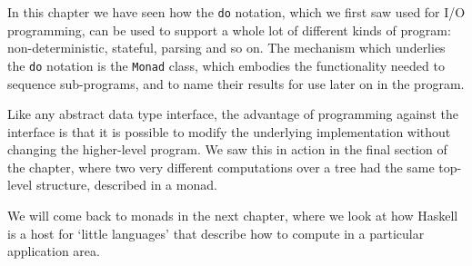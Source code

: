 \begin{summary}%
%
%

In this chapter we have seen how the \texttt{do} notation, which we first saw used for I/O programming, can be used to support a whole lot of different kinds of program: non-deterministic, stateful, parsing and so on. The mechanism which underlies the \texttt{do} notation is the \texttt{Monad} class, which embodies the functionality needed to sequence sub-programs, and to name their results for use later on in the program.

Like any abstract data type interface, the advantage of programming against the interface is that it is possible to modify the underlying implementation without changing the higher-level program. We saw this in action in the final section of the chapter, where two very different computations over a tree had the same top-level structure, described in a monad.

We will come back to monads in the next chapter, where we look at how Haskell is a host for `little languages' that describe how to compute in a particular application area.


\end{summary}

%
